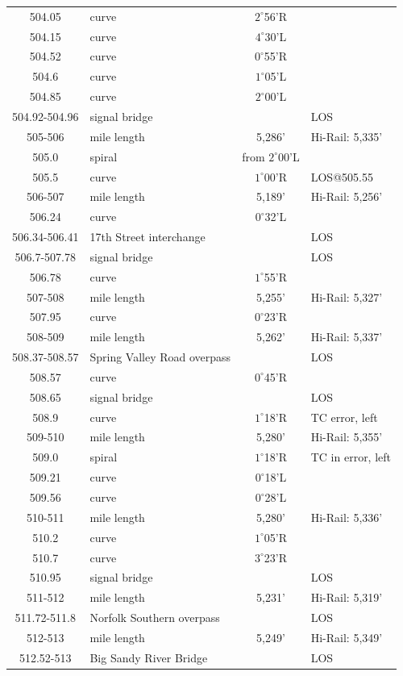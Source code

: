 \begin{center}
\begin{longtable}{c l c l}
	504.05&curve&$2^{\circ}$56'R&\\
	504.15&curve&$4^{\circ}$30'L&\\
	504.52&curve&$0^{\circ}$55'R&\\
	504.6&curve&$1^{\circ}$05'L&\\
	504.85&curve&$2^{\circ}$00'L&\\
	504.92-504.96&signal bridge&&LOS\\
505-506 & mile length & 5,286' &  Hi-Rail: 5,335' \\
	505.0&spiral&from $2^{\circ}$00'L&\\
	505.5&curve&$1^{\circ}$00'R&LOS@505.55\\
\hline
506-507 & mile length & 5,189' &  Hi-Rail: 5,256' \\
	506.24&curve&$0^{\circ}$32'L&\\
	506.34-506.41&17th Street interchange&&LOS\\
	506.7-507.78&signal bridge&&LOS\\
	506.78&curve&$1^{\circ}$55'R&\\
507-508 & mile length & 5,255' &  Hi-Rail: 5,327' \\
	507.95&curve&$0^{\circ}$23'R&\\
508-509 & mile length & 5,262' &  Hi-Rail: 5,337' \\
	508.37-508.57&Spring Valley Road overpass&&LOS\\
	508.57&curve&$0^{\circ}$45'R&\\
	508.65&signal bridge&& LOS \\
	508.9&curve&$1^{\circ}$18'R&TC error, left\\
509-510 & mile length & 5,280' &  Hi-Rail: 5,355' \\
	509.0&spiral&$1^{\circ}$18'R  & TC in error, left\\
	509.21&curve&$0^{\circ}$18'L&\\
	509.56&curve&$0^{\circ}$28'L&\\
510-511 & mile length & 5,280' &  Hi-Rail: 5,336' \\
	510.2&curve&$1^{\circ}$05'R&\\
	510.7&curve&$3^{\circ}$23'R&\\
	510.95&signal bridge& &LOS\\
\hline
511-512 & mile length & 5,231' &  Hi-Rail: 5,319' \\
	511.72-511.8&Norfolk Southern overpass&&LOS\\
512-513 & mile length & 5,249' &  Hi-Rail: 5,349' \\
	512.52-513&Big Sandy River Bridge&&LOS\\

\end{longtable}
\end{center}
